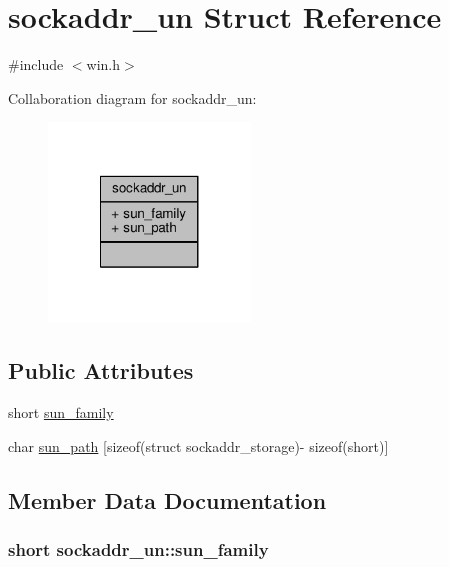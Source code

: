 \hypertarget{structsockaddr__un}{}\section{sockaddr\+\_\+un Struct Reference}
\label{structsockaddr__un}


{\ttfamily \#include $<$win.\+h$>$}



Collaboration diagram for sockaddr\+\_\+un\+:\nopagebreak
\begin{figure}[H]
\begin{center}
\leavevmode
\includegraphics[width=152pt]{structsockaddr__un__coll__graph}
\end{center}
\end{figure}
\subsection*{Public Attributes}
\begin{DoxyCompactItemize}
\item 
short \hyperlink{structsockaddr__un_a3ab1928116ebc6fbb80b72d52bf1750e}{sun\+\_\+family}
\item 
char \hyperlink{structsockaddr__un_a623d9818fff309e9e9a5a80b8bf9e0e0}{sun\+\_\+path} \mbox{[}sizeof(struct sockaddr\+\_\+storage)-\/                       sizeof(short)\mbox{]}
\end{DoxyCompactItemize}


\subsection{Member Data Documentation}
\subsubsection[{sun\+\_\+family}]{\setlength{\rightskip}{0pt plus 5cm}short sockaddr\+\_\+un\+::sun\+\_\+family}\hypertarget{structsockaddr__un_a3ab1928116ebc6fbb80b72d52bf1750e}{}\label{structsockaddr__un_a3ab1928116ebc6fbb80b72d52bf1750e}

